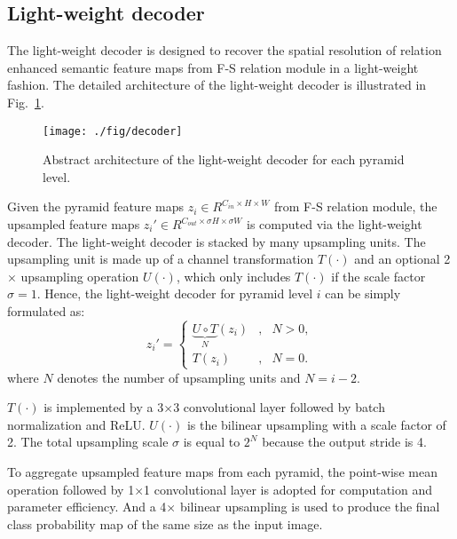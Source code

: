 \documentclass[10pt,twocolumn,letterpaper]{article}
\begin{document}
\subsection{Light-weight decoder}
The light-weight decoder is designed to recover the spatial resolution of relation enhanced semantic feature maps from F-S relation module in a light-weight fashion.
The detailed architecture of the light-weight decoder is illustrated in Fig.~\ref{fig:decoder}.

\begin{figure}[hbt]
   \begin{center}
      \texttt{[image: ./fig/decoder]}
   \end{center}
   \caption{Abstract architecture of the light-weight decoder for each pyramid level.}
   \label{fig:decoder}
\end{figure}

Given the pyramid feature maps $z_i \in R^{C_{in}\times H\times W}$  from F-S relation module, the upsampled feature maps $z_i' \in R^{C_{out}\times \sigma H\times \sigma W}$ is computed via the light-weight decoder.
The light-weight decoder is stacked by many upsampling units.
The upsampling unit is made up of a channel transformation $T(\cdot)$ and an optional 2$\times$ upsampling operation $U(\cdot)$, which only includes $T(\cdot)$ if the scale factor $\sigma = 1$.
Hence, the light-weight decoder for pyramid level $i$ can be simply formulated as:
\begin{equation}
   \label{eqn:zi}
   z_i'=\left\{
   \begin{aligned}
      \underbrace{U\circ T}_{N}(z_i) & , & N > 0, \\
      T(z_i)                         & , & N = 0.
   \end{aligned}
   \right.
\end{equation}
where $N$ denotes the number of upsampling units and $N = i - 2$.

$T(\cdot)$ is implemented by a 3$\times$3 convolutional layer followed by batch normalization and ReLU.
$U(\cdot)$ is the bilinear upsampling with a scale factor of 2.
The total upsampling scale $\sigma$ is equal to $2^N$ because the output stride is 4.

To aggregate upsampled feature maps from each pyramid, the point-wise mean operation followed by 1$\times$1 convolutional layer is adopted for computation and parameter efficiency.
And a 4$\times$ bilinear upsampling is used to produce the final class probability map of the same size as the input image.
\end{document}
